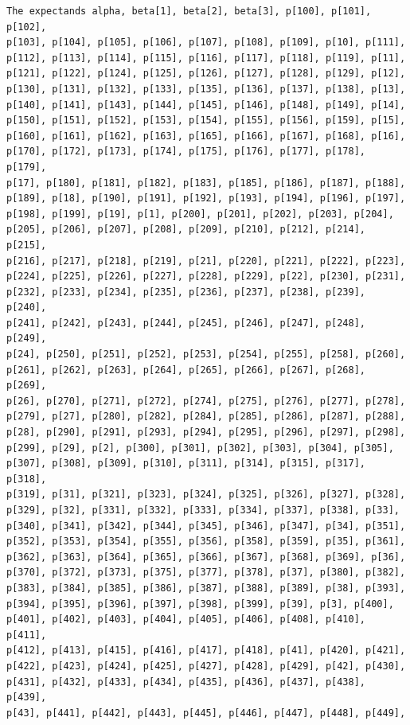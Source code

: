 \documentclass[
  letterpaper,
  DIV=11,
  numbers=noendperiod]{scrartcl}
\begin{document}
\begin{verbatim}
The expectands alpha, beta[1], beta[2], beta[3], p[100], p[101], p[102],
p[103], p[104], p[105], p[106], p[107], p[108], p[109], p[10], p[111],
p[112], p[113], p[114], p[115], p[116], p[117], p[118], p[119], p[11],
p[121], p[122], p[124], p[125], p[126], p[127], p[128], p[129], p[12],
p[130], p[131], p[132], p[133], p[135], p[136], p[137], p[138], p[13],
p[140], p[141], p[143], p[144], p[145], p[146], p[148], p[149], p[14],
p[150], p[151], p[152], p[153], p[154], p[155], p[156], p[159], p[15],
p[160], p[161], p[162], p[163], p[165], p[166], p[167], p[168], p[16],
p[170], p[172], p[173], p[174], p[175], p[176], p[177], p[178], p[179],
p[17], p[180], p[181], p[182], p[183], p[185], p[186], p[187], p[188],
p[189], p[18], p[190], p[191], p[192], p[193], p[194], p[196], p[197],
p[198], p[199], p[19], p[1], p[200], p[201], p[202], p[203], p[204],
p[205], p[206], p[207], p[208], p[209], p[210], p[212], p[214], p[215],
p[216], p[217], p[218], p[219], p[21], p[220], p[221], p[222], p[223],
p[224], p[225], p[226], p[227], p[228], p[229], p[22], p[230], p[231],
p[232], p[233], p[234], p[235], p[236], p[237], p[238], p[239], p[240],
p[241], p[242], p[243], p[244], p[245], p[246], p[247], p[248], p[249],
p[24], p[250], p[251], p[252], p[253], p[254], p[255], p[258], p[260],
p[261], p[262], p[263], p[264], p[265], p[266], p[267], p[268], p[269],
p[26], p[270], p[271], p[272], p[274], p[275], p[276], p[277], p[278],
p[279], p[27], p[280], p[282], p[284], p[285], p[286], p[287], p[288],
p[28], p[290], p[291], p[293], p[294], p[295], p[296], p[297], p[298],
p[299], p[29], p[2], p[300], p[301], p[302], p[303], p[304], p[305],
p[307], p[308], p[309], p[310], p[311], p[314], p[315], p[317], p[318],
p[319], p[31], p[321], p[323], p[324], p[325], p[326], p[327], p[328],
p[329], p[32], p[331], p[332], p[333], p[334], p[337], p[338], p[33],
p[340], p[341], p[342], p[344], p[345], p[346], p[347], p[34], p[351],
p[352], p[353], p[354], p[355], p[356], p[358], p[359], p[35], p[361],
p[362], p[363], p[364], p[365], p[366], p[367], p[368], p[369], p[36],
p[370], p[372], p[373], p[375], p[377], p[378], p[37], p[380], p[382],
p[383], p[384], p[385], p[386], p[387], p[388], p[389], p[38], p[393],
p[394], p[395], p[396], p[397], p[398], p[399], p[39], p[3], p[400],
p[401], p[402], p[403], p[404], p[405], p[406], p[408], p[410], p[411],
p[412], p[413], p[415], p[416], p[417], p[418], p[41], p[420], p[421],
p[422], p[423], p[424], p[425], p[427], p[428], p[429], p[42], p[430],
p[431], p[432], p[433], p[434], p[435], p[436], p[437], p[438], p[439],
p[43], p[441], p[442], p[443], p[445], p[446], p[447], p[448], p[449],

\end{verbatim}
\end{document}
